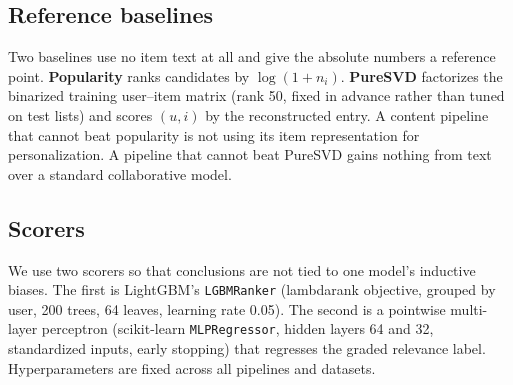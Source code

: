 \subsection{Reference baselines}
Two baselines use no item text at all and give the absolute numbers a
reference point. \textbf{Popularity} ranks candidates by $\log(1+n_i)$.
\textbf{PureSVD} \cite{puresvd} factorizes the binarized training
user--item matrix (rank 50, fixed in advance rather than tuned on test
lists) and scores $(u,i)$ by the reconstructed entry. A content pipeline
that cannot beat popularity is not using its item representation for
personalization. A pipeline that cannot beat PureSVD gains nothing from
text over a standard collaborative model.

\subsection{Scorers}
We use two scorers so that conclusions are not tied to one model's
inductive biases. The first is LightGBM's \texttt{LGBMRanker}
\cite{lightgbm} (lambdarank objective, grouped by user, 200 trees, 64
leaves, learning rate 0.05). The second is a pointwise multi-layer
perceptron (scikit-learn \texttt{MLPRegressor}, hidden layers 64 and 32,
standardized inputs, early stopping) that regresses the graded
relevance label. Hyperparameters are fixed across all pipelines and
datasets.
